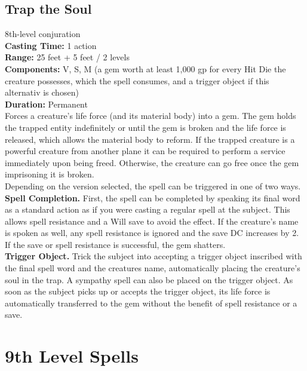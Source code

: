 \documentclass[11pt, A4paper, english]{article}
\begin{document}
		\subsection{Trap the Soul}
8th-level conjuration \\
\textbf{Casting Time:} 1 action \\
\textbf{Range:} 25 feet + 5 feet / 2 levels \\
\textbf{Components:} V, S, M (a gem worth at least 1,000 gp for every Hit Die the creature possesses, which the spell consumes, and a trigger object if this alternativ is chosen) \\
\textbf{Duration:} Permanent \\
Forces a creature’s life force (and its material body) into a gem. The gem holds the trapped entity indefinitely or until the gem is broken and the life force is released, which allows the material body to reform. If the trapped creature is a powerful creature from another plane it can be required to perform a service immediately upon being freed. Otherwise, the creature can go free once the gem imprisoning it is broken. \\
Depending on the version selected, the spell can be triggered in one of two ways. \\
\textbf{Spell Completion.} First, the spell can be completed by speaking its final word as a standard action as if you were casting a regular spell at the subject. This allows spell resistance and a Will save to avoid the effect. If the creature’s name is spoken as well, any spell resistance is ignored and the save DC increases by 2. If the save or spell resistance is successful, the gem shatters. \\
\textbf{Trigger Object.} Trick the subject into accepting a trigger object inscribed with the final spell word and the creatures name, automatically placing the creature’s soul in the trap. A sympathy spell can also be placed on the trigger object. As soon as the subject picks up or accepts the trigger object, its life force is automatically transferred to the gem without the benefit of spell resistance or a save.


	\section{9th Level Spells}
\end{document}
